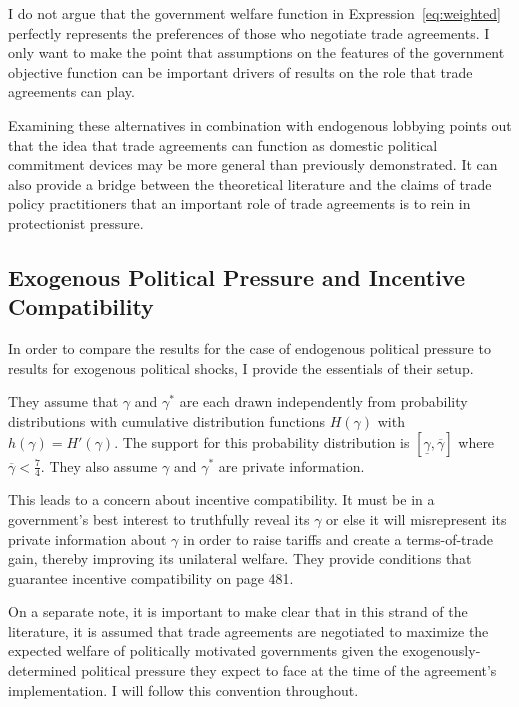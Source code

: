 \documentclass[12pt]{article}
\newcommand{\ov}{\overline}
\newcommand{\un}{\underline}
\newcommand{\ga}{\gamma}
\begin{document}

I do not argue that the government welfare function in Expression~\ref{eq:weighted} perfectly represents the preferences of those who negotiate trade agreements. I only want to make the point that assumptions on the features of the government objective function can be important drivers of results on the role that trade agreements can play. 

Examining these alternatives in combination with endogenous lobbying points out that the idea that trade agreements can function as domestic political commitment devices may be more general than previously demonstrated. It can also provide a bridge between the theoretical literature and the claims of trade policy practitioners that an important role of trade agreements is to rein in protectionist pressure.

\subsection{Exogenous Political Pressure and Incentive Compatibility}
In order to compare the results for the case of endogenous political pressure to \Textcite{bs2005} results for exogenous political shocks, I provide the essentials of their setup. 

They assume that $\ga$ and $\ga^*$ are each drawn independently from probability distributions with cumulative distribution functions $H(\ga)$ with $h(\ga)=H'(\ga)$. The support for this probability distribution is $\left[\un{\ga}, \ov{\ga} \right]$ where $\ov{\ga} < \frac{7}{4}$. They also assume $\ga$ and $\ga^*$ are private information.

This leads to a concern about incentive compatibility. It must be in a government's best interest to truthfully reveal its $\ga$ or else it will misrepresent its private information about $\ga$ in order to raise tariffs and create a terms-of-trade gain, thereby improving its unilateral welfare. They provide conditions that guarantee incentive compatibility on page 481.

On a separate note, it is important to make clear that in this strand of the literature, it is assumed that trade agreements are negotiated to maximize the expected welfare of politically motivated governments given the exogenously-determined political pressure they expect to face at the time of the agreement's implementation. I will follow this convention throughout.
\end{document}
